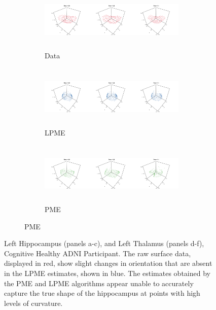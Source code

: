 \documentclass[12pt]{article}
\begin{document}
\begin{figure}
  \begin{subfigure}{\textwidth}
    \label{fig:adni_lthal_result}
    \begin{subfigure}{\textwidth}
      \centering
      \includegraphics[height=3cm]{adni_plots/adni_lthal_data_plot}
      \caption{Data}
    \end{subfigure}
    \begin{subfigure}{\textwidth}
      \centering
      \includegraphics[height=3cm]{adni_plots/adni_lthal_lpme_isomap_plot}
      \caption{LPME}
    \end{subfigure}
    \begin{subfigure}{\textwidth}
      \centering
      \includegraphics[height=3cm]{adni_plots/adni_lthal_pme_plot}
      \caption{PME}
    \end{subfigure}   
  \end{subfigure}

  \caption{Left Hippocampus (panels a-c), and Left Thalamus (panels d-f), Cognitive Healthy ADNI Participant. The raw surface data, displayed in red, show slight changes in orientation that are absent in the LPME estimates, shown in blue. The estimates obtained by the PME and LPME algorithms appear unable to accurately capture the true shape of the hippocampus at points with high levels of curvature.}
  \label{fig:adni_result}
\end{figure}
\end{document}
